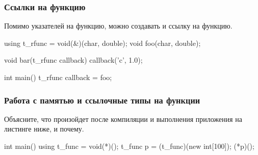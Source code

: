 \documentclass[compress, 8pt, aspectratio=169]{beamer}
\begin{document}
\begin{frame}[fragile]

    \frametitle{Ссылки на функцию}

    Помимо указателей на функцию, можно создавать
    и ссылку на функцию.

    \begin{myinplacelisting}[minted language=cpp]
using t_rfunc = void(&)(char, double);
void foo(char, double);

void bar(t_rfunc callback) {
    callback('c', 1.0);
}

int main() {
    t_rfunc callback = foo;
}
    \end{myinplacelisting}

\end{frame}

\begin{frame}[fragile]

    \frametitle{Работа с памятью и ссылочные типы на функции}

    \begin{task}
        Объясните, что произойдет после компиляции и выполнения
        приложения на листинге ниже, и почему.
    \end{task}

    \begin{myinplacelisting}[minted language=cpp]
int main() {
    using t_func = void(*)();
    t_func p = (t_func)(new int[100]);
    (*p)();
}
    \end{myinplacelisting}
    
\end{frame}
\end{document}

